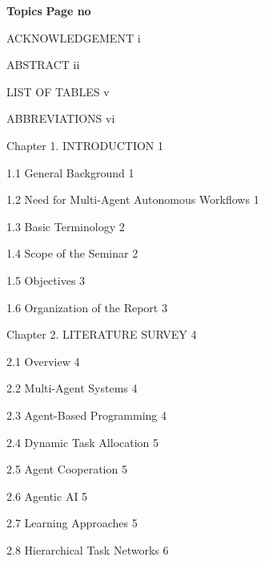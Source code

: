 \documentclass[12pt,letterpaper]{article}
\begin{document}
\begingroup
\setlength{\parskip}{0pt}
\fontsize{11.3pt}{12.4pt}\selectfont
\noindent\textbf{Topics} \hfill \textbf{Page no}\par
\vspace{2pt}
\noindent ACKNOWLEDGEMENT \hfill i\par
\noindent ABSTRACT \hfill ii\par
\noindent LIST OF TABLES \hfill v\par
\noindent ABBREVIATIONS \hfill vi\par
\noindent Chapter 1. INTRODUCTION \hfill 1\par
\noindent\hspace*{28pt} 1.1 General Background \hfill 1\par
\noindent\hspace*{28pt} 1.2 Need for Multi-Agent Autonomous Workflows \hfill 1\par
\noindent\hspace*{28pt} 1.3 Basic Terminology \hfill 2\par
\noindent\hspace*{28pt} 1.4 Scope of the Seminar \hfill 2\par
\noindent\hspace*{28pt} 1.5 Objectives \hfill 3\par
\noindent\hspace*{28pt} 1.6 Organization of the Report \hfill 3\par
\noindent Chapter 2. LITERATURE SURVEY \hfill 4\par
\noindent\hspace*{28pt} 2.1 Overview \hfill 4\par
\noindent\hspace*{28pt} 2.2 Multi-Agent Systems \hfill 4\par
\noindent\hspace*{28pt} 2.3 Agent-Based Programming \hfill 4\par
\noindent\hspace*{28pt} 2.4 Dynamic Task Allocation \hfill 5\par
\noindent\hspace*{28pt} 2.5 Agent Cooperation \hfill 5\par
\noindent\hspace*{28pt} 2.6 Agentic AI \hfill 5\par
\noindent\hspace*{28pt} 2.7 Learning Approaches \hfill 5\par
\noindent\hspace*{28pt} 2.8 Hierarchical Task Networks \hfill 6\par
\end{document}
